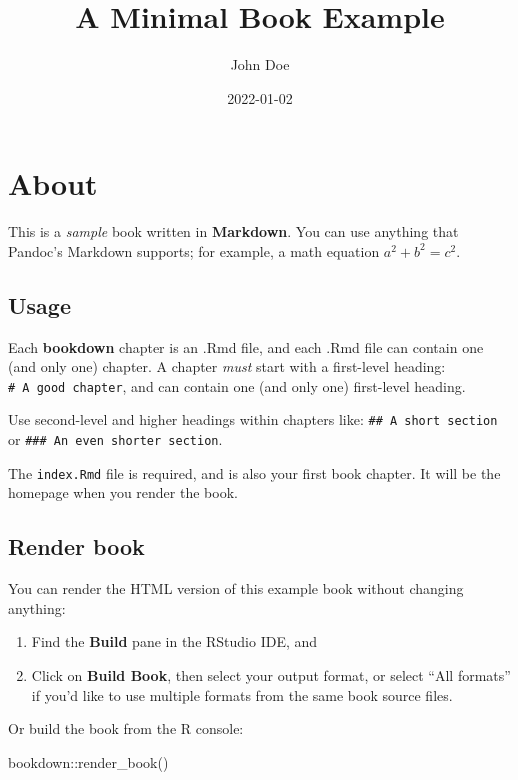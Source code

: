 \documentclass[
]{book}
\title{A Minimal Book Example}
\author{John Doe}
\date{2022-01-02}
\newenvironment{Shaded}{\begin{snugshade}}{\end{snugshade}}
\newcommand{\FunctionTok}[1]{\textcolor[rgb]{0.00,0.00,0.00}{#1}}
\newcommand{\NormalTok}[1]{#1}
\newcommand{\SpecialCharTok}[1]{\textcolor[rgb]{0.00,0.00,0.00}{#1}}
\theoremstyle{definition}
\theoremstyle{definition}
\theoremstyle{definition}
\theoremstyle{definition}
\theoremstyle{remark}
\begin{document}
\maketitle

{
\setcounter{tocdepth}{1}
\tableofcontents
}
\hypertarget{about}{%
\chapter{About}\label{about}}

This is a \emph{sample} book written in \textbf{Markdown}. You can use anything that Pandoc's Markdown supports; for example, a math equation \(a^2 + b^2 = c^2\).

\hypertarget{usage}{%
\section{Usage}\label{usage}}

Each \textbf{bookdown} chapter is an .Rmd file, and each .Rmd file can contain one (and only one) chapter. A chapter \emph{must} start with a first-level heading: \texttt{\#\ A\ good\ chapter}, and can contain one (and only one) first-level heading.

Use second-level and higher headings within chapters like: \texttt{\#\#\ A\ short\ section} or \texttt{\#\#\#\ An\ even\ shorter\ section}.

The \texttt{index.Rmd} file is required, and is also your first book chapter. It will be the homepage when you render the book.

\hypertarget{render-book}{%
\section{Render book}\label{render-book}}

You can render the HTML version of this example book without changing anything:

\begin{enumerate}
\def\labelenumi{\arabic{enumi}.}
\item
  Find the \textbf{Build} pane in the RStudio IDE, and
\item
  Click on \textbf{Build Book}, then select your output format, or select ``All formats'' if you'd like to use multiple formats from the same book source files.
\end{enumerate}

Or build the book from the R console:

\begin{Shaded}
\begin{Highlighting}[]
\NormalTok{bookdown}\SpecialCharTok{::}\FunctionTok{render\_book}\NormalTok{()}
\end{Highlighting}
\end{Shaded}
\end{document}
